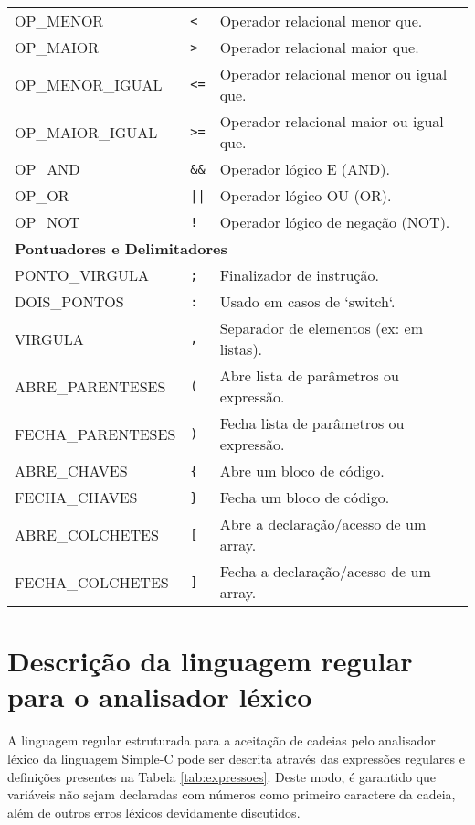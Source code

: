\documentclass[12pt,a4paper]{article}
\begin{document}
\begin{longtable}{lll}
OP\_MENOR & \texttt{<} & Operador relacional menor que. \\
OP\_MAIOR & \texttt{>} & Operador relacional maior que. \\
OP\_MENOR\_IGUAL & \texttt{<=} & Operador relacional menor ou igual que. \\
OP\_MAIOR\_IGUAL & \texttt{>=} & Operador relacional maior ou igual que. \\
OP\_AND & \texttt{\&\&} & Operador lógico E (AND). \\
OP\_OR & \texttt{||} & Operador lógico OU (OR). \\
OP\_NOT & \texttt{!} & Operador lógico de negação (NOT). \\
\midrule
\multicolumn{3}{l}{\textbf{Pontuadores e Delimitadores}} \\
\midrule
PONTO\_VIRGULA & \texttt{;} & Finalizador de instrução. \\
DOIS\_PONTOS & \texttt{:} & Usado em casos de `switch`. \\
VIRGULA & \texttt{,} & Separador de elementos (ex: em listas). \\
ABRE\_PARENTESES & \texttt{(} & Abre lista de parâmetros ou expressão. \\
FECHA\_PARENTESES & \texttt{)} & Fecha lista de parâmetros ou expressão. \\
ABRE\_CHAVES & \texttt{\{} & Abre um bloco de código. \\
FECHA\_CHAVES & \texttt{\}} & Fecha um bloco de código. \\
ABRE\_COLCHETES & \texttt{[} & Abre a declaração/acesso de um array. \\
FECHA\_COLCHETES & \texttt{]} & Fecha a declaração/acesso de um array. \\
\end{longtable}

\newpage

\section{Descrição da linguagem regular para o analisador léxico}
\label{sec:desc}

A linguagem regular estruturada para a aceitação de cadeias pelo analisador léxico da linguagem Simple-C pode ser descrita através das expressões regulares e definições presentes na Tabela \ref{tab:expressoes}. Deste modo, é garantido que variáveis não sejam declaradas com números como primeiro caractere da cadeia, além de outros erros léxicos devidamente discutidos.
\end{document}
